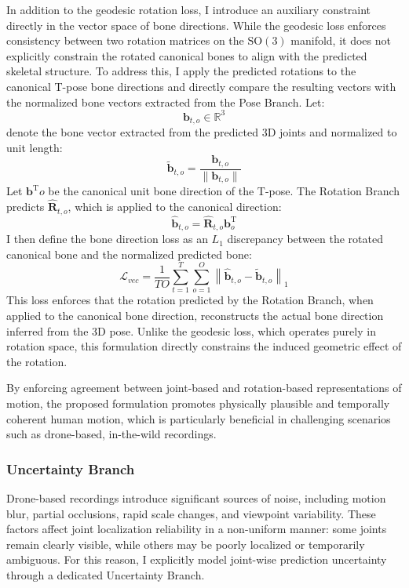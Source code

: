 In addition to the geodesic rotation loss, I introduce an auxiliary constraint directly in the vector space of bone directions. While the geodesic loss enforces consistency between two rotation matrices on the $\mathrm{SO}(3)$ manifold,
it does not explicitly constrain the rotated canonical bones to align with the predicted skeletal structure. To address this, I apply the predicted rotations to the canonical T-pose bone directions and directly compare the 
resulting vectors with the normalized bone vectors extracted from the Pose Branch. Let:
\begin{equation}
    \mathbf{b}_{t,o} \in \mathbb{R}^{3}
\end{equation}
denote the bone vector extracted from the predicted 3D joints and normalized to unit length:
\begin{equation}
    \tilde{\mathbf{b}}_{t,o} = \frac{\mathbf{b}_{t,o}} {\|\mathbf{b}_{t,o}\|}
\end{equation}
Let $\mathbf{b}^{\text{T}}o$ be the canonical unit bone direction of the T-pose. The Rotation Branch predicts $\hat{\mathbf{R}}_{t,o}$, which is applied to the canonical direction:
\begin{equation}
    \hat{\mathbf{b}}_{t,o} = \hat{\mathbf{R}}_{t,o} \mathbf{b}^{\text{T}}_{o} 
\end{equation}
I then define the bone direction loss as an $L_1$ discrepancy between the rotated canonical bone and the normalized predicted bone:
\begin{equation}
    \mathcal{L}_{vec} = \frac{1}{TO} \sum_{t=1}^{T} \sum_{o=1}^{O} \left\| \hat{\mathbf{b}}_{t,o} - \tilde{\mathbf{b}}_{t,o} \right\|_1
\end{equation}
This loss enforces that the rotation predicted by the Rotation Branch, when applied to the canonical bone direction, reconstructs the actual bone direction inferred from the 3D pose. Unlike the geodesic loss, which operates purely 
in rotation space, this formulation directly constrains the induced geometric effect of the rotation.

By enforcing agreement between joint-based and rotation-based representations of motion, the proposed formulation promotes physically plausible and temporally coherent human motion, which is particularly beneficial in challenging 
scenarios such as drone-based, in-the-wild recordings.


\subsubsection{Uncertainty Branch}
Drone-based recordings introduce significant sources of noise, including motion blur, partial occlusions, rapid scale changes, and viewpoint variability. These factors affect joint localization reliability in a non-uniform manner: 
some joints remain clearly visible, while others may be poorly localized or temporarily ambiguous. For this reason, I explicitly model joint-wise prediction uncertainty through a dedicated Uncertainty Branch.

